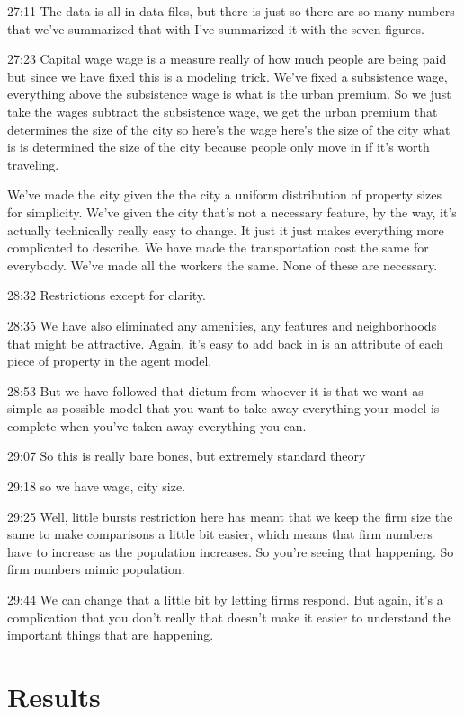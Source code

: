 \documentclass[]{article}
\begin{document}
27:11
The data is all in data files, but there is just so there are so many numbers that we've summarized that with I've summarized it with the seven figures.

27:23
Capital wage wage is a measure really of how much people are being paid but since we have fixed this is a modeling trick. We've fixed a subsistence wage, everything above the subsistence wage is what is the urban premium. So we just take the wages subtract the subsistence wage, we get the urban premium that determines the size of the city so here's the wage here's the size of the city what is is determined the size of the city because people only move in if it's worth traveling. 

We've made the city given the the city a uniform distribution of property sizes for simplicity. We've given the city that's not a necessary feature, by the way, it's actually technically really easy to change. It just it just makes everything more complicated to describe. We have made the transportation cost the same for everybody. We've made all the workers the same. None of these are necessary.

28:32
Restrictions except for clarity.

28:35
We have also eliminated any amenities, any features and neighborhoods that might be attractive. Again, it's easy to add back in is an attribute of each piece of property in the agent model.

28:53
But we have followed that dictum from whoever it is that we want as simple as possible model that you want to take away everything your model is complete when you've taken away everything you can.

29:07
So this is really bare bones, but extremely standard theory

29:18
so we have wage, city size.

29:25
Well, little bursts restriction here has meant that we keep the firm size the same to make comparisons a little bit easier, which means that firm numbers have to increase as the population increases. So you're seeing that happening. So firm numbers mimic population.

29:44
We can change that a little bit by letting firms respond. But again, it's a complication that you don't really that doesn't make it easier to understand the important things that are happening.


\section{Results}
\end{document}
